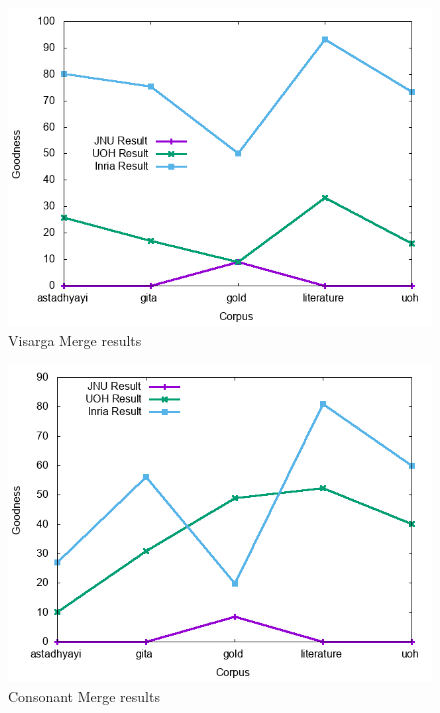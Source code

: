 \documentclass[11pt]{article}
\begin{document}
\begin{figure}[h]
	\center
	\includegraphics[scale=0.34]{images/visargamerge.png}
	\caption{\label{screen}Visarga Merge results}
\end{figure}

\begin{figure}[h]
	\center
	\includegraphics[scale=0.34]{images/consonantmerge.png}
	\caption{\label{screen}Consonant Merge results}
\end{figure}
\end{document}
